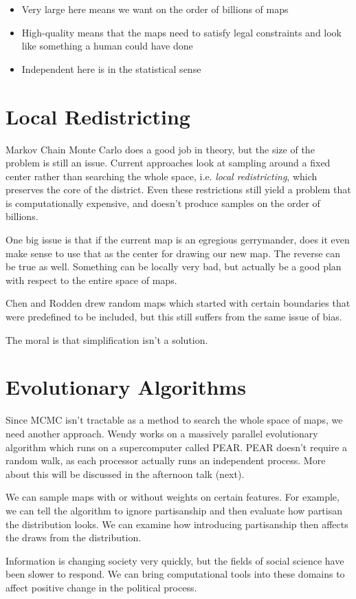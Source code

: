 \begin{itemize}
	\item Very large here means we want on the order of billions of maps
	\item High-quality means that the maps need to satisfy legal constraints and look like something a human could have done
	\item Independent here is in the statistical sense
\end{itemize}

\section*{Local Redistricting}
	Markov Chain Monte Carlo does a good job in theory, but the size of the problem is still an issue.  Current approaches look at sampling around a fixed center rather than searching the whole space, i.e. \textit{local redistricting}, which preserves the core of the district.  Even these restrictions still yield a problem that is computationally expensive, and doesn't produce samples on the order of billions.
	
	One big issue is that if the current map is an egregious gerrymander, does it even make sense to use that as the center for drawing our new map.  The reverse can be true as well. Something can be locally very bad, but actually be a good plan with respect to the entire space of maps.
	
	Chen and Rodden drew random maps which started with certain boundaries that were predefined to be included, but this still suffers from the same issue of bias.
	
	The moral is that simplification isn't a solution.
	
	
\section*{Evolutionary Algorithms}

Since MCMC isn't tractable as a method to search the whole space of maps, we need another approach.  Wendy works on a massively parallel evolutionary algorithm which runs on a supercomputer called PEAR.  PEAR doesn't require a random walk, as each processor actually runs an independent process.  More about this will be discussed in the afternoon talk (next).

We can sample maps with or without weights on certain features.  For example, we can tell the algorithm to ignore partisanship and then evaluate how partisan the distribution looks.  We can examine how introducing partisanship then affects the draws from the distribution.

Information is changing society very quickly, but the fields of social science have been slower to respond.  We can bring computational tools into these domains to affect positive change in the political process.